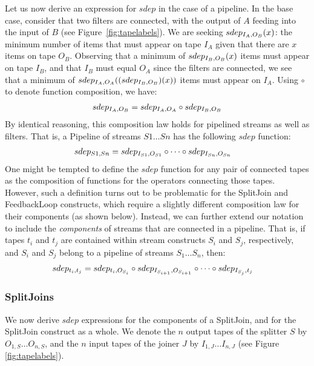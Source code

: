 Let us now derive an expression for $sdep$ in the case of a pipeline.
In the base case, consider that two filters are connected, with the
output of $A$ feeding into the input of $B$ (see
Figure~\ref{fig:tapelabels}).  We are seeking $sdep_{I_A, O_B}(x)$: the
minimum number of items that must appear on tape $I_A$ given that
there are $x$ items on tape $O_B$.  Observing that a minimum of
$sdep_{I_B, O_B}(x)$ items must appear on tape $I_B$, and that $I_B$
must equal $O_A$ since the filters are connected, we see that a
minimum of $sdep_{I_A, O_A}((sdep_{I_B, O_B})(x))$ items must appear
on $I_A$.  Using $\circ$ to denote function composition, we have:
\begin{align*}
sdep_{I_A, O_B} = sdep_{I_A, O_A} \circ sdep_{I_B, O_B}
\end{align*}
By identical reasoning, this composition law holds for pipelined
streams as well as filters.  That is, a Pipeline of streams $S1 \dots
Sn$ has the following $sdep$ function:
\begin{align}
\label{eq:composepipe}
sdep_{S1, Sn} &= sdep_{I_{S1}, O_{S1}} \circ \dots \circ sdep_{I_{Sn}, O_{Sn}}
\end{align}
One might be tempted to define the $sdep$ function for any pair of
connected tapes as the composition of functions for the operators
connecting those tapes.  However, such a definition turns out to be
problematic for the SplitJoin and FeedbackLoop constructs, which
require a slightly different composition law for their components (as
shown below).  Instead, we can further extend our notation to include
the {\it components} of streams that are connected in a pipeline.
That is, if tapes $t_i$ and $t_j$ are contained within stream
constructs $S_i$ and $S_j$, respectively, and $S_i$ and $S_j$ belong
to a pipeline of streams $S_1 \dots S_n$, then:
\begin{align}
\label{eq:composetape}
sdep_{t_i, t_j} &= sdep_{t_i, O_{S_i}} \circ sdep_{I_{S_{i+1}}, O_{S_{i+1}}}
\circ \dots \circ sdep_{I_{S_j}, t_j}
\end{align}

\subsubsection{SplitJoins}
\label{sec:timesj}

We now derive $sdep$ expressions for the components of a SplitJoin, and
for the SplitJoin construct as a whole.  We denote the $n$ output
tapes of the splitter $S$ by $O_{1,S} \dots O_{n,S}$, and the $n$ input
tapes of the joiner $J$ by $I_{1,J} \dots I_{n,J}$ (see Figure
\ref{fig:tapelabels}).

